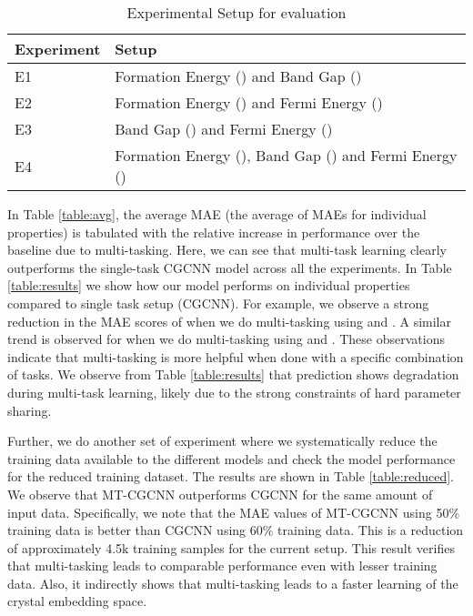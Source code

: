 \documentclass{article}
\newcommand{\method}[1]{MT-CGCNN}
\newcommand{\baseline}[1]{CGCNN}
\newcommand{\propone}[1]{Formation Energy}
\newcommand{\proponesym}[1]{}
\newcommand{\proptwo}[1]{Band Gap}
\newcommand{\proptwosym}[1]{}
\newcommand{\propthree}[1]{Fermi Energy}
\newcommand{\propthreesym}[1]{}
\begin{document}
\begin{table}[h]
	\caption{Experimental Setup for evaluation}
	\label{table:experiments}
	\centering
	\begin{tabular}{ll}
		\toprule
		Experiment 			&Setup 											\\
		\midrule
		E1					&\propone{} (\proponesym{}) and \proptwo{} (\proptwosym{})				\\
		E2					&\propone{} (\proponesym{}) and \propthree{} (\propthreesym{})				\\
		E3					&\proptwo{} (\proptwosym{}) and \propthree{} (\propthreesym{}) 					\\
		E4					&\propone{} (\proponesym{}), \proptwo{} (\proptwosym{}) and \propthree{} (\propthreesym{})	\\
		\bottomrule
	\end{tabular}
\end{table}

In Table \ref{table:avg}, the average MAE (the average of MAEs for individual properties) is tabulated with the relative increase in performance over the baseline due to multi-tasking. Here, we can see that multi-task learning clearly outperforms the single-task \baseline{} model across all the experiments. In Table \ref{table:results} we show how our model performs on individual properties compared to single task setup (\baseline{}). For example, we observe a strong reduction in the MAE scores of \proptwosym{} when we do multi-tasking using \proptwosym{} and \proponesym{}. A similar trend is observed for \propthreesym{} when we do multi-tasking using \proponesym{} and \propthreesym{}. These observations indicate that multi-tasking is more helpful when done with a specific combination of tasks. We observe from Table \ref{table:results} that \proponesym{} prediction shows degradation during multi-task learning, likely due to the strong constraints of hard parameter sharing.

Further, we do another set of experiment where we systematically reduce the training data available to the different models and check the model performance for the reduced training dataset. The results are shown in Table \ref{table:reduced}. We observe that \method{} outperforms \baseline{} for the same amount of input data. Specifically, we note that the MAE values of \method{} using 50\% training data is better than \baseline{} using 60\% training data. This is a reduction of approximately 4.5k training samples for the current setup. This result verifies that multi-tasking leads to comparable performance even with lesser training data. Also, it indirectly shows that multi-tasking leads to a faster learning of the crystal embedding space.
\end{document}
